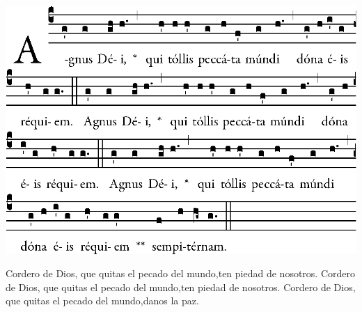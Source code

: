 \begin{center}
\includegraphics[width=.9\textwidth]{src/ordinario/agnus.eps}
\end{center}

\be Cordero de Dios, que quitas el pecado del mundo,\redast ten piedad de nosotros.
\be Cordero de Dios, que quitas el pecado del mundo,\redast ten piedad de nosotros.
\be Cordero de Dios, que quitas el pecado del mundo,\redast danos la paz.